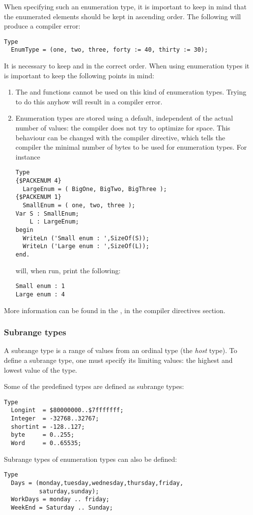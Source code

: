 When specifying such an enumeration type, it is important to keep in mind
that the enumerated elements should be kept in ascending order. The
following will produce a compiler error:
\begin{verbatim}
Type
  EnumType = (one, two, three, forty := 40, thirty := 30);
\end{verbatim}
It is necessary to keep  and  in the correct order.
When using enumeration types it is important to keep the following points
in mind:
\begin{enumerate}
\item The  and  functions cannot be used on
this kind of enumeration types. Trying to do this anyhow will result in a
compiler error.
\item Enumeration types are stored using a default, independent of the
actual number of values: the compiler does not try to optimize for space.
This behaviour can be changed with the  compiler 
directive, which tells the compiler the minimal number of bytes to be 
used for enumeration types.
For instance
\begin{verbatim}
Type
{$PACKENUM 4}
  LargeEnum = ( BigOne, BigTwo, BigThree );
{$PACKENUM 1}
  SmallEnum = ( one, two, three );
Var S : SmallEnum;
    L : LargeEnum;
begin
  WriteLn ('Small enum : ',SizeOf(S));
  WriteLn ('Large enum : ',SizeOf(L));
end.
\end{verbatim}
will, when run, print the following:
\begin{verbatim}
Small enum : 1
Large enum : 4
\end{verbatim}
\end{enumerate}
More information can be found in the \progref, in the compiler directives
section.
%
%
\subsubsection{Subrange types}
A subrange type is a range of values from an ordinal type (the {\em host}
type). To define a subrange type, one must specify its limiting values: 
the highest and lowest value of the type.

Some of the predefined  types are defined as subrange types:
\begin{verbatim}
Type
  Longint  = $80000000..$7fffffff;
  Integer  = -32768..32767;
  shortint = -128..127;
  byte     = 0..255;
  Word     = 0..65535;
\end{verbatim}
Subrange types of enumeration types can also be defined:
\begin{verbatim}
Type
  Days = (monday,tuesday,wednesday,thursday,friday,
          saturday,sunday);
  WorkDays = monday .. friday;
  WeekEnd = Saturday .. Sunday;
\end{verbatim}
%
